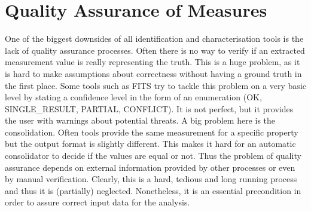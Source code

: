 \section{Quality Assurance of Measures}
One of the biggest downsides of all identification and characterisation tools is the lack of quality assurance processes. Often there is no way to verify if an extracted measurement value is really representing the truth. This is a huge problem, as it is hard to make assumptions about correctness without having a ground truth in the first place.
Some tools such as FITS try to tackle this problem on a very basic level by stating a confidence level in the form of an enumeration (OK, SINGLE\_RESULT, PARTIAL, CONFLICT). It is not perfect, but it provides the user with warnings about potential threats.
A big problem here is the consolidation. Often tools provide the same measurement for a specific property but the output format is slightly different. This makes it hard for an automatic consolidator to decide if the values are equal or not. Thus the problem of quality assurance depends on external information provided by other processes or even by manual verification. 
Clearly, this is a hard, tedious and long running process and thus it is (partially) neglected.
Nonetheless, it is an essential precondition in order to assure correct input data for the analysis.


